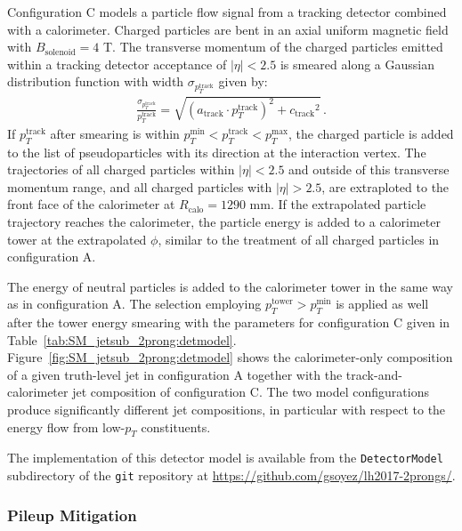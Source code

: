 Configuration C models a particle flow signal from a tracking detector combined with a calorimeter. 
Charged particles are bent in an axial uniform magnetic field with $B_{\text{solenoid}} = 4$ T.
The transverse momentum of the charged particles emitted within a tracking detector acceptance of $|\eta|<2.5$
is smeared along a Gaussian distribution function with width $\sigma_{\ensuremath{p_{T}^{\text{track}}}}$ given by:
\begin{align}
  \frac{\sigma_{\ensuremath{p_{T}^{\text{track}}}}}{\ensuremath{p_{T}^{\text{track}}}} = \sqrt{(\ensuremath{a_{\text{track}}}\cdot\ensuremath{p_{T}^{\text{track}}})^{2} + \ensuremath{c_{\text{track}}}^{2}}\,.
  \label{eq:SM_jetsub_2prong:trkreso}
\end{align} 
If \ensuremath{p_{T}^{\text{track}}}{} after smearing is within $\ensuremath{p_{T}^{\text{min}}} < \ensuremath{p_{T}^{\text{track}}} < \ensuremath{p_{T}^{\text{max}}}$, the charged particle is added to the list of pseudoparticles with its direction at the interaction vertex. 
The trajectories of all charged particles within $|\eta| < 2.5$ and outside of this transverse momentum range, 
and all charged particles with $|\eta| > 2.5$, are extraploted to the front face of the calorimeter at $R_{\text{calo}} = 1290$ mm.
If the extrapolated particle trajectory reaches the calorimeter, the particle energy is added to a calorimeter tower at the extrapolated $\phi$, similar to the treatment of all charged particles in configuration A.

The energy of neutral particles is added to the calorimeter tower in the same way as in configuration A. 
The selection employing $\ensuremath{p_{T}^{\text{tower}}} > \ensuremath{p_{T}^{\text{min}}}$ is applied as well after the tower energy smearing with the parameters for configuration C given in Table~\ref{tab:SM_jetsub_2prong:detmodel}. 
Figure~\ref{fig:SM_jetsub_2prong:detmodel} shows the calorimeter-only composition of a given truth-level jet in configuration A together with the track-and-calorimeter jet composition of configuration C.
The two model configurations produce significantly different jet
compositions, in particular with respect to the energy flow from
low-\ensuremath{p_{T}}{} constituents.

The implementation of this detector model is available from the
{\tt{DetectorModel}} subdirectory of the {\tt{git}} repository at \url{https://github.com/gsoyez/lh2017-2prongs/}.


\subsubsection{Pileup Mitigation}\label{sec:SM_jetsub_2prong:pu_tech}


